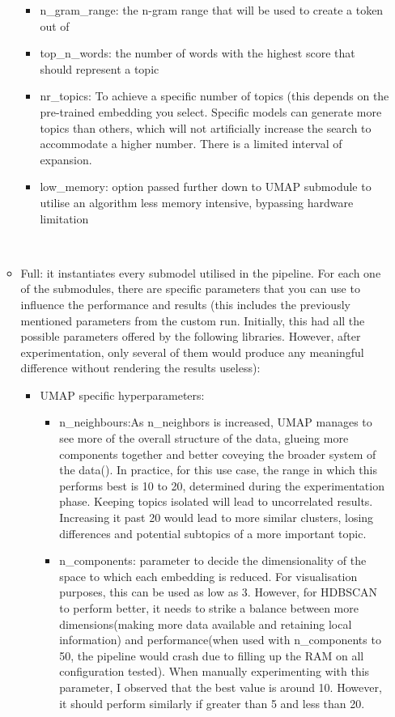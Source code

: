 \documentclass[12pt,MSc,a4paper,oneside]{muthesis}
\begin{document}
\begin{itemize}
\begin{itemize}
        \begin{itemize}
            \item n\_gram\_range: the n-gram range that will be used to create a token out of
            \item top\_n\_words: the number of words with the highest score that should represent a topic
            \item nr\_topics: To achieve a specific number of topics (this depends on the pre-trained embedding you select. Specific models can generate more topics than others, which will not artificially increase the search to accommodate a higher number. There is a limited interval of expansion.
            \item low\_memory: option passed further down to UMAP submodule to utilise an algorithm less memory intensive, bypassing hardware limitation
        \end{itemize}\\
        \item Full: it instantiates every submodel utilised in the pipeline. For each one of the submodules, there are specific parameters that you can use to influence the performance and results (this includes the previously mentioned parameters from the custom run. Initially, this had all the possible parameters offered by the following libraries. However, after experimentation, only several of them would produce any meaningful difference without rendering the results useless):
        \begin{itemize}
            \item UMAP specific hyperparameters:
                \begin{itemize}
                    \item n\_neighbours:As n\_neighbors is increased, UMAP manages to see more of the overall structure of the data, glueing more components together and better coveying the broader system of the data(\cite{umap-parameters}). In practice, for this use case, the range in which this performs best is 10 to 20, determined during the experimentation phase. Keeping topics isolated will lead to uncorrelated results. Increasing it past 20 would lead to more similar clusters, losing differences and potential subtopics of a more important topic.
                    \item n\_components: parameter to decide the dimensionality of the space to which each embedding is reduced. For visualisation purposes, this can be used as low as 3. However, for HDBSCAN to perform better, it needs to strike a balance between more dimensions(making more data available and retaining local information) and performance(when used with n\_components to 50, the pipeline would crash due to filling up the RAM on all configuration tested). When manually experimenting with this parameter, I observed that the best value is around 10. However, it should perform similarly if greater than 5 and less than 20.

\end{itemize}
\end{itemize}
\end{itemize}
\end{itemize}
\end{document}
